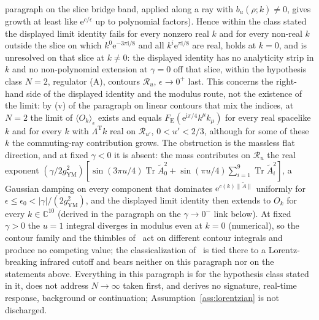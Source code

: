 paragraph on the slice bridge band, applied along a ray with \(b_u(\hat\rho;k)\ne0\), gives growth at least like \(\mathrm e^{c/\epsilon}\) up to polynomial factors). Hence within the class stated the displayed limit identity fails for every nonzero real \(k\) and for every non-real \(k\) outside the slice on which \(k^0\mathrm e^{-3\pi\mathrm i/8}\) and all \(k^i\mathrm e^{\pi\mathrm i/8}\) are real, holds at \(k=0\), and is unresolved on that slice at \(k\ne0\): the displayed identity has no analyticity strip in \(k\) and no non-polynomial extension at \(\gamma=0\) off that slice, within the hypothesis class \(N=2\), regulator (A), contours \(\mathcal R_u\), \(\epsilon\to0^+\) last. This concerns the right-hand side of the displayed identity and the modulus route, not the existence of the limit: by (v) of the paragraph on linear contours that mix the indices, at \(N=2\) the limit of \(\langle O_k\rangle_\epsilon\) exists and equals \(F_{\mathrm E}(\mathrm e^{\mathrm i\pi/4}k^\mu k_\mu)\) for every real spacelike \(k\) and for every \(k\) with \(\Lambda^{\mathrm T}k\) real on \(\mathcal R_{u'}\), \(0<u'<2/3\), although for some of these \(k\) the commuting-ray contribution grows. The obstruction is the massless flat direction, and at fixed \(\gamma<0\) it is absent: the mass contributes on \(\mathcal R_u\) the real exponent \((\gamma/2g_{\mathrm{YM}}^2)[\sin(3\pi u/4)\operatorname{Tr}\tilde A_0^2+\sin(\pi u/4)\sum_{i=1}^{9}\operatorname{Tr}\tilde A_i^2]\), a Gaussian damping on every component that dominates \(\mathrm e^{c(k)\|\tilde A\|}\) uniformly for \(\epsilon\le\epsilon_0<|\gamma|/(2g_{\mathrm{YM}}^2)\), and the displayed limit identity then extends to \(O_k\) for every \(k\in\mathbb C^{10}\) (derived in the paragraph on the \(\gamma\to0^-\) link below). At fixed \(\gamma>0\) the \(u=1\) integral diverges in modulus even at \(k=0\) (numerical), so the contour family and the thimbles of~\cite{ChouNishimuraTripathi2025} act on different contour integrals and produce no competing value; the classicalization of~\cite{AsanoNishimuraPiensukYamamori2025} is tied there to a Lorentz-breaking infrared cutoff and bears neither on this paragraph nor on the statements above. Everything in this paragraph is for the hypothesis class stated in it, does not address \(N\to\infty\) taken first, and derives no signature, real-time response, background or continuation; Assumption~\ref{ass:lorentzian} is not discharged.

